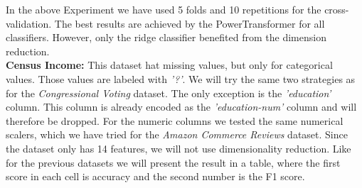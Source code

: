 \documentclass[a4paper,10pt]{article}
\begin{document}
In the above Experiment we have used 5 folds and 10 repetitions for the cross-validation. The best results are achieved by the PowerTransformer for all classifiers. However, only the ridge classifier benefited from the
dimension reduction.\\
\textbf{Census Income:} This dataset hat missing values, but only for categorical values.
 Those values are labeled with \textit{'?'}. We will try the same two strategies as for the \textit{Congressional Voting} dataset.
 The only exception is the \textit{'education'} column. This column is already encoded as the
 \textit{'education-num'} column and will therefore be dropped. For the numeric columns 
 we tested the same numerical scalers, which we have tried for the 
 \textit{Amazon Commerce Reviews} dataset. Since the dataset only has 14 features,
we will not use dimensionality reduction. Like for the previous
datasets we will present the result in a table, where the first score in each cell is accuracy and the second
number is the F1 score.
\end{document}
